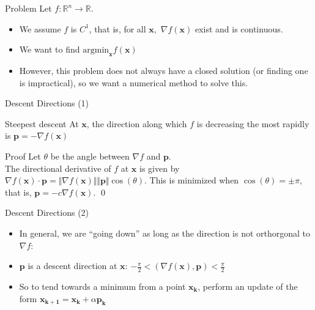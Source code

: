 \documentclass{beamer}
\newcommand{\R}{\mathbb{R}}
\begin{document}
    \begin{frame}{Problem}
        Let $f: \R^n \rightarrow \R $. 
        \begin{itemize}
        \item We assume $f$ is $C^1$, that is, for all $\mathbf{x},$ $\nabla f(\mathbf{x})$ exist and is continuous.

        \item We want to find $\text{argmin}_{\mathbf{x}} f(\textbf{x})$ 
        
        \item However, this problem does not always have a closed solution (or finding one is impractical), so we want a numerical method to solve this.  
        \end{itemize}
    \end{frame}


    \begin{frame}{Descent Directions (1)}
        \begin{block}{Steepest descent}
            At $\mathbf{x}$, the direction along which $f$ is decreasing the most rapidly is $\mathbf{p} = -\nabla f(\mathbf{x})$ 
        \end{block}

        \begin{alertblock}{Proof}
            Let $\theta$ be the angle between $\nabla f$ and $\mathbf{p}$. \\
            The directional derivative of $f$ at $\mathbf{x}$ is given by $\nabla f(\mathbf{x}) \cdot \mathbf{p} = \Vert \nabla f (\mathbf{x}) \Vert \Vert \mathbf{p} \Vert \cos(\theta)$. This is minimized when $\cos(\theta) = \pm \pi$, that is, $\mathbf{p} = -c \nabla f(\mathbf{x})$. \qed
        \end{alertblock}
    \end{frame}
 
    \begin{frame}{Descent Directions (2)}
        \begin{itemize}
        \item In general, we are ``going down'' as long as the direction is not orthorgonal to $\nabla f$:
        
        \item $\mathbf{p}$ is a \alert{descent direction} at $\mathbf{x}$: $-\frac{\pi}{2} < (\nabla f(\mathbf{x}), \mathbf{p}) < \frac{\pi}{2}$
        
        \item So to tend towards a minimum from a point $\mathbf{x_k}$, perform an update of the form $\mathbf{x_{k+1}} = \mathbf{x_k} + \alpha \mathbf{p_k}$
        \end{itemize}
    \end{frame}
\end{document}
